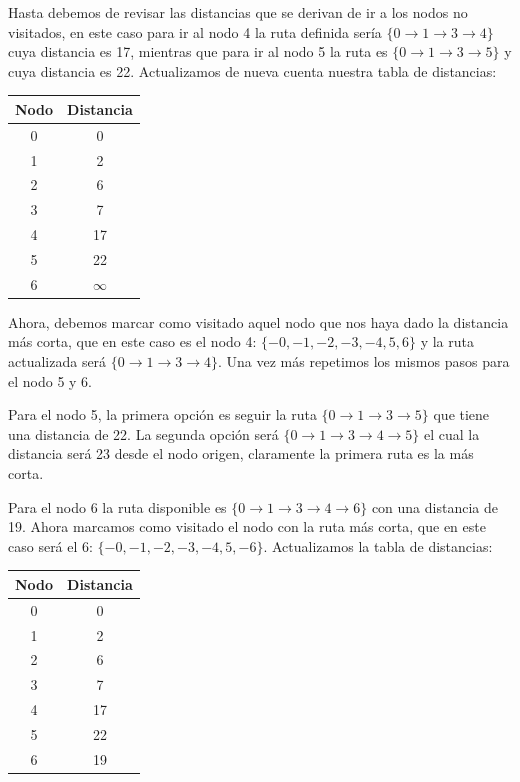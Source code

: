 \documentclass[
]{article}
\begin{document}
Hasta debemos de revisar las distancias que se derivan de ir a los nodos
no visitados, en este caso para ir al nodo 4 la ruta definida sería
\(\{0 \rightarrow 1 \rightarrow 3 \rightarrow 4\}\) cuya distancia es
17, mientras que para ir al nodo 5 la ruta es
\(\{0 \rightarrow 1 \rightarrow 3 \rightarrow 5\}\) y cuya distancia es
22. Actualizamos de nueva cuenta nuestra tabla de distancias:

\begin{longtable}[]{@{}cc@{}}
\toprule()
Nodo & Distancia \\
\midrule()
\endhead
0 & 0 \\
1 & 2 \\
2 & 6 \\
3 & 7 \\
4 & 17 \\
5 & 22 \\
6 & \(\infty\) \\
\bottomrule()
\end{longtable}

Ahora, debemos marcar como visitado aquel nodo que nos haya dado la
distancia más corta, que en este caso es el nodo 4:
\(\{-0,-1,-2,-3,-4,5,6 \}\) y la ruta actualizada será
\(\{0 \rightarrow 1 \rightarrow 3 \rightarrow 4\}\). Una vez más
repetimos los mismos pasos para el nodo 5 y 6.

Para el nodo 5, la primera opción es seguir la ruta
\(\{0 \rightarrow 1 \rightarrow 3 \rightarrow 5\}\) que tiene una
distancia de 22. La segunda opción será
\(\{0 \rightarrow 1 \rightarrow 3 \rightarrow 4 \rightarrow 5\}\) el
cual la distancia será 23 desde el nodo origen, claramente la primera
ruta es la más corta.

Para el nodo 6 la ruta disponible es
\(\{0 \rightarrow 1 \rightarrow 3 \rightarrow 4 \rightarrow 6\}\) con
una distancia de 19. Ahora marcamos como visitado el nodo con la ruta
más corta, que en este caso será el 6: \(\{-0,-1,-2,-3,-4,5,-6 \}\).
Actualizamos la tabla de distancias:

\begin{longtable}[]{@{}cc@{}}
\toprule()
Nodo & Distancia \\
\midrule()
\endhead
0 & 0 \\
1 & 2 \\
2 & 6 \\
3 & 7 \\
4 & 17 \\
5 & 22 \\
6 & 19 \\
\bottomrule()
\end{longtable}
\end{document}
